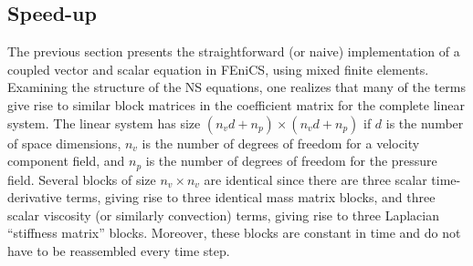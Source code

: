 \subsection{Speed-up}
\label{sec:mortensen:speed-up}

The previous section presents the straightforward (or naive)
implementation of a coupled vector and scalar equation in FEniCS,
using mixed finite elements.  Examining the structure of the NS
equations, one realizes that many of the terms give rise to similar
block matrices in the coefficient matrix for the complete linear
system. The linear system has size $(n_vd + n_p) \times (n_vd + n_p)$ if
$d$ is the number of space dimensions, $n_v$ is the number of degrees
of freedom for a velocity component field, and $n_p$ is the number of
degrees of freedom for the pressure field.  Several blocks of size
$n_v\times n_v$ are identical since there are three scalar
time-derivative terms, giving rise to three identical mass matrix
blocks, and three scalar viscosity (or similarly convection) terms,
giving rise to three Laplacian ``stiffness matrix'' blocks.  Moreover,
these blocks are constant in time and do not have to be reassembled
every time step.

